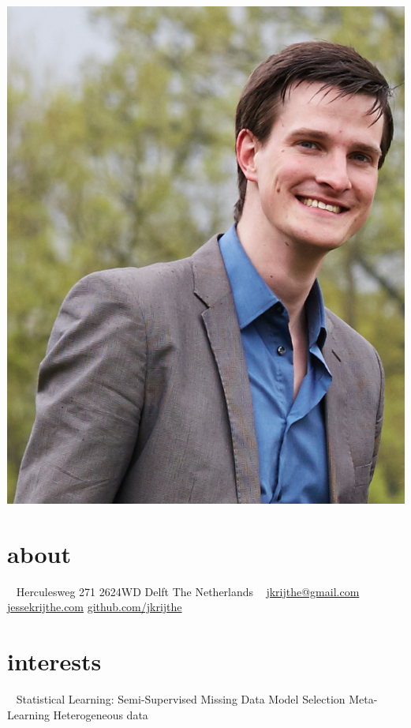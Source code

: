 \documentclass[]{friggeri-cv}
\begin{document}
       {}


\begin{aside}
  \includegraphics[scale=0.15]{photo.png}
  \section{about}
  ~
  Herculesweg 271
  2624WD Delft
  The Netherlands
  ~
  \href{mailto:jkrijthe@gmail.com}{jkrijthe@gmail.com} \textcolor{gray}{\faEnvelopeO}
  \href{http://jessekrijthe.com}{jessekrijthe.com} \textcolor{gray}{\faGlobe}
  \href{http://github.com/jkrijthe}{github.com/jkrijthe} \textcolor{gray}{\faGithub}
  \section{interests}
  ~
  Statistical Learning:
  Semi-Supervised
  Missing Data
  Model Selection
  Meta-Learning
  Heterogeneous data
  \iftoggle{long}{\section{languages}
  ~
  English (fluent) 
  Dutch (native)
  German (beginner)
  French (beginner)
  Mandarin (beginner)}{~}
\end{aside}
\end{document}
